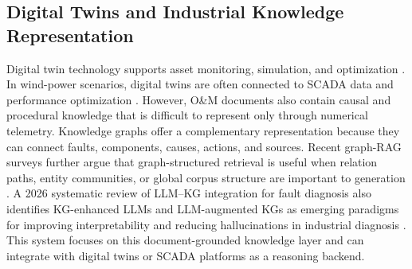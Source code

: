 \documentclass[lettersize,journal]{IEEEtran}
\begin{document}
\subsection{Digital Twins and Industrial Knowledge Representation}
Digital twin technology supports asset monitoring, simulation, and optimization \cite{grieves2017digital,tao2019digital,barricelli2019survey}. In wind-power scenarios, digital twins are often connected to SCADA data and performance optimization \cite{liu2021digital}. However, O\&M documents also contain causal and procedural knowledge that is difficult to represent only through numerical telemetry. Knowledge graphs offer a complementary representation because they can connect faults, components, causes, actions, and sources. Recent graph-RAG surveys further argue that graph-structured retrieval is useful when relation paths, entity communities, or global corpus structure are important to generation \cite{peng2024graphragSurvey}. A 2026 systematic review of LLM--KG integration for fault diagnosis also identifies KG-enhanced LLMs and LLM-augmented KGs as emerging paradigms for improving interpretability and reducing hallucinations in industrial diagnosis \cite{razaq2026llmkgfaultreview}. This system focuses on this document-grounded knowledge layer and can integrate with digital twins or SCADA platforms as a reasoning backend.
\end{document}
